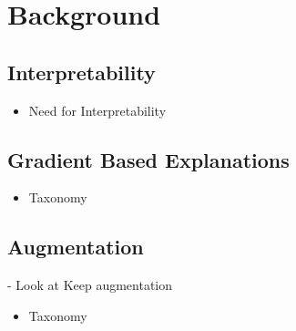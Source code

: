 \chapter{Background}
\section{Interpretability}
\begin{itemize}
	\item Need for Interpretability
\end{itemize}
\section{Gradient Based Explanations}
\begin{itemize}
	\item Taxonomy
\end{itemize}
\section{Augmentation}
- Look at Keep augmentation
\begin{itemize}
	\item Taxonomy
\end{itemize}
